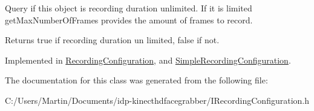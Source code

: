 Query if this object is recording duration unlimited. If it is limited get\+Max\+Number\+Of\+Frames provides the amount of frames to record. 

\begin{DoxyReturn}{Returns}
true if recording duration un limited, false if not. 
\end{DoxyReturn}


Implemented in \hyperlink{class_recording_configuration_a4f68458e01f778ea850e47aa658b6212}{Recording\+Configuration}, and \hyperlink{class_simple_recording_configuration_a87d0cf9356d24d1c6c7bb1bd6ad238ad}{Simple\+Recording\+Configuration}.



The documentation for this class was generated from the following file\+:\begin{DoxyCompactItemize}
\item 
C\+:/\+Users/\+Martin/\+Documents/idp-\/kinecthdfacegrabber/I\+Recording\+Configuration.\+h\end{DoxyCompactItemize}
